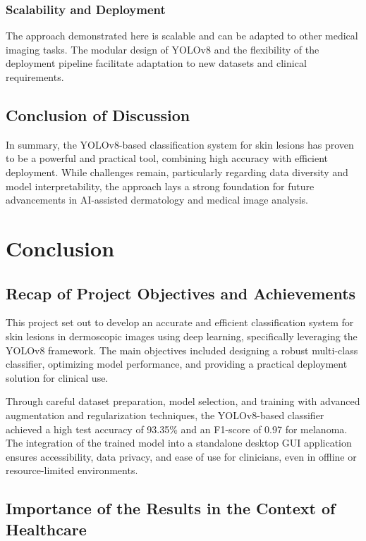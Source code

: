 \documentclass[a4paper,12pt]{report}
\begin{document}
\begin{spacing}{1.5}
        \subsection*{Scalability and Deployment}
        The approach demonstrated here is scalable and can be adapted to other medical imaging tasks. The modular design of YOLOv8 and the flexibility of the deployment pipeline facilitate adaptation to new datasets and clinical requirements.
    
    \section*{Conclusion of Discussion}
    In summary, the YOLOv8-based classification system for skin lesions has proven to be a powerful and practical tool, combining high accuracy with efficient deployment. While challenges remain, particularly regarding data diversity and model interpretability, the approach lays a strong foundation for future advancements in AI-assisted dermatology and medical image analysis.

\newpage

\chapter{Conclusion}

    \section*{Recap of Project Objectives and Achievements}
    
    This project set out to develop an accurate and efficient classification system for skin lesions in dermoscopic images using deep learning, specifically leveraging the YOLOv8 framework. The main objectives included designing a robust multi-class classifier, optimizing model performance, and providing a practical deployment solution for clinical use.
        
    Through careful dataset preparation, model selection, and training with advanced augmentation and regularization techniques, the YOLOv8-based classifier achieved a high test accuracy of 93.35\% and an F1-score of 0.97 for melanoma. The integration of the trained model into a standalone desktop GUI application ensures accessibility, data privacy, and ease of use for clinicians, even in offline or resource-limited environments.
        
    \section*{Importance of the Results in the Context of Healthcare}
    

\end{spacing}
\end{document}
